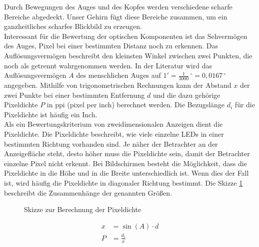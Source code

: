 Durch Bewegungen des Auges und des Kopfes werden verschiedene scharfe Bereiche abgedeckt. Unser Gehirn fügt diese Bereiche zusammen, um ein ganzheitliches scharfes Blickbild zu erzeugen. \cite[Vgl. Seite 14]{Buhler.2017} \\
Interessant für die Bewertung der optischen Komponenten ist das Sehvermögen des Auges, Pixel bei einer bestimmten Distanz noch zu erkennen. Das Auflösungsvermögen beschreibt den kleinsten Winkel zwischen zwei Punkten, die noch als getrennt wahrgenommen werden. In der Literatur wird das Auflösungsvermögen $ A $ des menschlichen Auges auf $ 1' = \frac{1}{3000}\,^\circ = 0,0167\,^\circ $ angegeben. Mithilfe von trigonometrischen Rechnungen kann der Abstand $ x $ der zwei Punkte bei einer bestimmten Entfernung $ d $ und die dazu gehörige Pixeldichte $ P $ in ppi (pixel per inch) berechnet werden. Die Bezugslänge $ d_{i} $ für die Pixeldichte ist häufig ein Inch. \cite[Vgl. Seite 209 f.]{LofflerMang.2020} \\
Als ein Bewertungskriterium von zweidimensionalen Anzeigen dient die Pixeldichte. Die Pixeldichte beschreibt, wie viele einzelne LEDs in einer bestimmten Richtung vorhanden sind. Je näher der Betrachter an der Anzeigefläche steht, desto höher muss die Pixeldichte sein, damit der Betrachter einzelne Pixel nicht erkennt. Bei Bildschirmen besteht die Möglichkeit, dass die Pixeldichte in die Höhe und in die Breite unterschiedlich ist. Wenn dies der Fall ist, wird häufig die Pixeldichte in diagonaler Richtung bestimmt. Die Skizze \ref{fig:Rechnung} beschreibt die Zusammenhänge der genannten Größen. \\
\begin{figure}[hbt]
	\centering
	
	\caption[Skizze zur Berechnung der Pixeldichte]{Skizze zur Berechnung der Pixeldichte}
	\label{fig:Rechnung}
\end{figure}
\begin{align}
	x &= \sin (A) \cdot d \\
	P &= \frac{d_{i}}{x}
\end{align}


